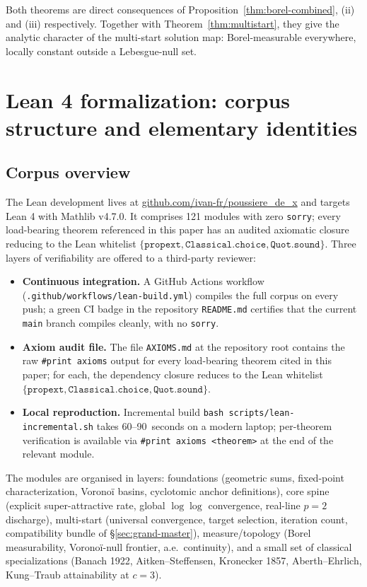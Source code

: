 \documentclass[11pt,a4paper]{article}
\theoremstyle{definition}
\begin{document}
Both theorems are direct consequences of Proposition~\ref{thm:borel-combined}, (ii) and (iii) respectively. Together with Theorem~\ref{thm:multistart}, they give the analytic character of the multi-start solution map: Borel-measurable everywhere, locally constant outside a Lebesgue-null set.

\section{Lean 4 formalization: corpus structure and elementary identities}
\label{sec:lean-corpus}

\subsection{Corpus overview}

The Lean development lives at
\url{github.com/ivan-fr/poussiere_de_x} and targets Lean 4 with Mathlib v4.7.0. It comprises 121 modules with zero \texttt{sorry}; every load-bearing theorem referenced in this paper has an audited axiomatic closure reducing to the Lean whitelist $\{\texttt{propext}, \texttt{Classical.choice}, \texttt{Quot.sound}\}$. Three layers of verifiability are offered to a third-party reviewer:
\begin{itemize}
  \item \textbf{Continuous integration.} A GitHub Actions workflow (\texttt{.github/workflows/lean-build.yml}) compiles the full corpus on every push; a green CI badge in the repository \texttt{README.md} certifies that the current \texttt{main} branch compiles cleanly, with no \texttt{sorry}.
  \item \textbf{Axiom audit file.} The file \texttt{AXIOMS.md} at the repository root contains the raw \texttt{\#print axioms} output for every load-bearing theorem cited in this paper; for each, the dependency closure reduces to the Lean whitelist $\{\texttt{propext}, \texttt{Classical.choice}, \texttt{Quot.sound}\}$.
  \item \textbf{Local reproduction.} Incremental build \texttt{bash scripts/lean-incremental.sh} takes 60--90~seconds on a modern laptop; per-theorem verification is available via \texttt{\#print axioms <theorem>} at the end of the relevant module.
\end{itemize}
The modules are organised in layers: foundations (geometric sums, fixed-point characterization, Voronoï basins, cyclotomic anchor definitions), core spine (explicit super-attractive rate, global $\log\log$ convergence, real-line $p = 2$ discharge), multi-start (universal convergence, target selection, iteration count, compatibility bundle of \S\ref{sec:grand-master}), measure/topology (Borel measurability, Voronoï-null frontier, a.e.\ continuity), and a small set of classical specializations (Banach 1922, Aitken--Steffensen, Kronecker 1857, Aberth--Ehrlich, Kung--Traub attainability at $c=3$).
\end{document}
